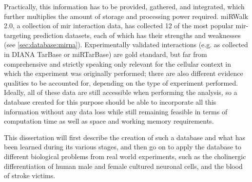 Practically, this information has to be provided, gathered, and integrated, which further multiplies the amount of storage and processing power required. miRWalk 2.0, a collection of \ac{mir} interaction data, has collected 12 of the most popular \ac{mir}-targeting prediction datasets, each of which has their strengths and weaknesses (see \ref{sec:database:mirna}). Experimentally validated interactions (e.g. as collected in DIANA TarBase or miRTarBase) are gold standard, but far from comprehensive and strictly speaking only relevant for the cellular context in which the experiment was originally performed; there are also different evidence qualities to be accounted for, depending on the type of experiment performed. Ideally, all of these data are still accessible when performing the analysis, so a database created for this purpose should be able to incorporate all this information without any data loss while still remaining feasible in terms of computation time as well as space and working memory requirements. 

This dissertation will first describe the creation of such a database and what has been learned during its various stages, and then go on to apply the database to different biological problems from real world experiments, such as the cholinergic differentiation of human male and female cultured neuronal cells, and the blood of stroke victims.